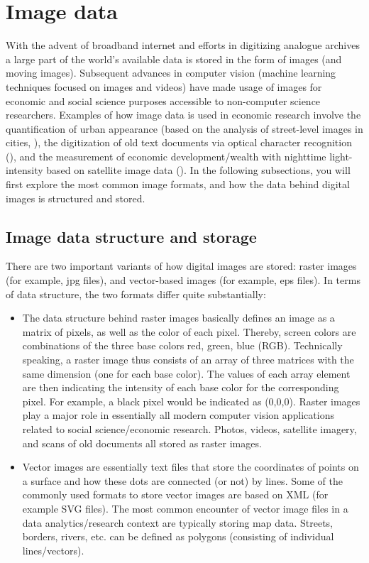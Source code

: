 \documentclass[
  12pt,
]{style/krantz}
\begin{document}
\hypertarget{image-data}{%
\chapter{Image data}\label{image-data}}

With the advent of broadband internet and efforts in digitizing analogue archives a large part of the world's available data is stored in the form of images (and moving images). Subsequent advances in computer vision (machine learning techniques focused on images and videos) have made usage of images for economic and social science purposes accessible to non-computer science researchers. Examples of how image data is used in economic research involve the quantification of urban appearance (based on the analysis of street-level images in cities, \citet{naik_etal2016}), the digitization of old text documents via optical character recognition (\citet{cesarini_etal2016}), and the measurement of economic development/wealth with nighttime light-intensity based on satellite image data (\citet{hodler_raschky2014}). In the following subsections, you will first explore the most common image formats, and how the data behind digital images is structured and stored.

\hypertarget{image-data-structure-and-storage}{%
\section{Image data structure and storage}\label{image-data-structure-and-storage}}

There are two important variants of how digital images are stored: raster images (for example, jpg files), and vector-based images (for example, eps files). In terms of data structure, the two formats differ quite substantially:

\begin{itemize}
\item
  The data structure behind raster images basically defines an image as a matrix of pixels, as well as the color of each pixel. Thereby, screen colors are combinations of the three base colors red, green, blue (RGB). Technically speaking, a raster image thus consists of an array of three matrices with the same dimension (one for each base color). The values of each array element are then indicating the intensity of each base color for the corresponding pixel. For example, a black pixel would be indicated as (0,0,0). Raster images play a major role in essentially all modern computer vision applications related to social science/economic research. Photos, videos, satellite imagery, and scans of old documents all stored as raster images.
\item
  Vector images are essentially text files that store the coordinates of points on a surface and how these dots are connected (or not) by lines. Some of the commonly used formats to store vector images are based on XML (for example SVG files). The most common encounter of vector image files in a data analytics/research context are typically storing map data. Streets, borders, rivers, etc. can be defined as polygons (consisting of individual lines/vectors).
\end{itemize}
\end{document}
